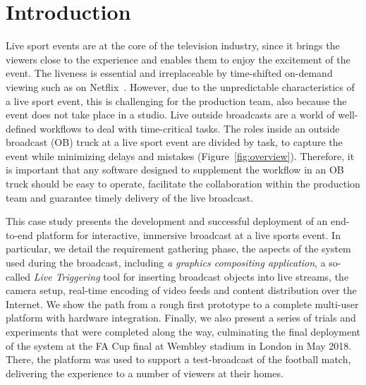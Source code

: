 \documentclass[sigchi-a, authorversion]{acmart}
\begin{document}

\maketitle

\section{Introduction}
 Live sport events are at the core of the television industry, since it brings
 the viewers close to the experience and enables them to enjoy the excitement of the
 event. The liveness is essential and irreplaceable by time-shifted on-demand viewing
 such as on Netflix~\cite{matrix2014netflix}.
 However, due to the unpredictable characteristics of a live sport event, this
 is challenging for the production team, also because the event does not take
 place in a studio. Live outside broadcasts are a world of well-defined
 workflows to deal with time-critical tasks. The roles inside an outside broadcast
 (OB) truck at a live sport event are divided by task, to capture
 the event while minimizing delays and mistakes (Figure~\ref{fig:overview}). Therefore, it is
 important that any software designed to supplement the workflow in an OB truck
 should be easy to operate, facilitate the collaboration within the production team
 and guarantee timely delivery of the live broadcast.

 This case study presents the development and successful deployment of an
 end-to-end platform for interactive, immersive broadcast at
 a live sports event. In particular, we detail the requirement gathering phase,
 the aspects of the system used during the broadcast, including \emph{a graphics compositing
 application}, a so-called \emph{Live Triggering} tool for inserting broadcast objects
 into live streams, the camera setup, real-time encoding of video feeds and content
 distribution over the Internet.
 We show the path from a rough first prototype to a complete multi-user platform
 with hardware integration. Finally, we also present a series of trials and
 experiments that were completed along the way, culminating the final
 deployment of the system at the FA Cup final at Wembley stadium in London in
 May 2018. There, the platform was used to support a test-broadcast of the
 football match, delivering the experience to a number of viewers at
 their homes.
\end{document}
